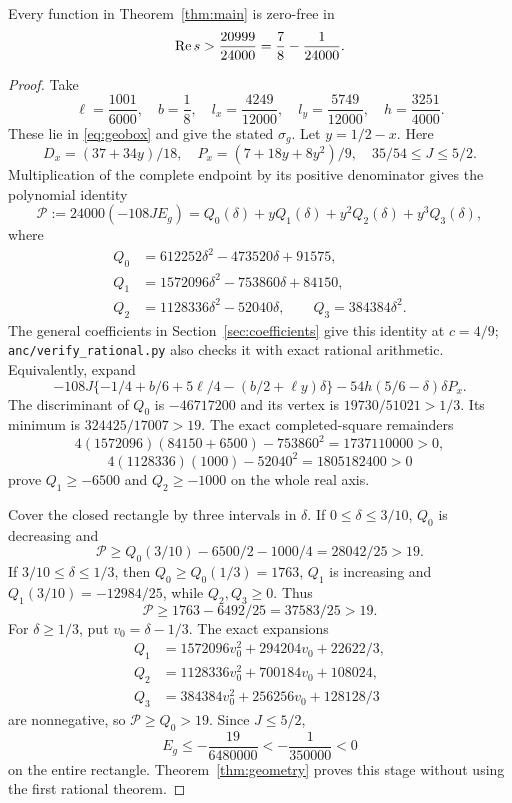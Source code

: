 \begin{theorem}\label{thm:rational2}
Every function in Theorem~\ref{thm:main} is zero-free in
\[
 \operatorname{Re} s>\frac{20999}{24000}=\frac78-\frac1{24000}.
\]
\end{theorem}
\begin{proof}
Take
\[
 \ell=\frac{1001}{6000},\quad b=\frac18,\quad
 l_x=\frac{4249}{12000},\quad l_y=\frac{5749}{12000},\quad
 h=\frac{3251}{4000}.
\]
These lie in \eqref{eq:geobox} and give the stated $\sigma_g$.
Let $y=1/2-x$. Here
\[
 D_x=(37+34y)/18,\quad P_x=(7+18y+8y^2)/9,\quad35/54\le J\le5/2.
\]
Multiplication of the complete endpoint by its positive denominator gives the polynomial identity
\begin{equation}\label{eq:rationalpoly}
 \mathscr P:=24000(-108JE_g)=Q_0(\delta)+yQ_1(\delta)+y^2Q_2(\delta)+y^3Q_3(\delta),
\end{equation}
where
\begin{align*}
 Q_0&=612252\delta^2-473520\delta+91575,\\
 Q_1&=1572096\delta^2-753860\delta+84150,\\
 Q_2&=1128336\delta^2-52040\delta,\qquad Q_3=384384\delta^2.
\end{align*}
The general coefficients in Section~\ref{sec:coefficients} give this identity at $c=4/9$; \nolinkurl{anc/verify_rational.py} also checks it with exact rational arithmetic. Equivalently, expand
\[
 -108J\{-1/4+b/6+5\ell/4-(b/2+\ell y)\delta\}
 -54h(5/6-\delta)\delta P_x.
\]
The discriminant of $Q_0$ is $-46717200$ and its vertex is $19730/51021>1/3$. Its minimum is $324425/17007>19$. The exact completed-square remainders
\[
 4(1572096)(84150+6500)-753860^2=1737110000>0,
\]
\[
 4(1128336)(1000)-52040^2=1805182400>0
\]
prove $Q_1\ge-6500$ and $Q_2\ge-1000$ on the whole real axis.

Cover the closed rectangle by three intervals in $\delta$. If $0\le\delta\le3/10$, $Q_0$ is decreasing and
\[
 \mathscr P\ge Q_0(3/10)-6500/2-1000/4
              =28042/25>19.
\]
If $3/10\le\delta\le1/3$, then $Q_0\ge Q_0(1/3)=1763$, $Q_1$ is increasing and $Q_1(3/10)=-12984/25$, while $Q_2,Q_3\ge0$. Thus
\[
 \mathscr P\ge1763-6492/25=37583/25>19.
\]
For $\delta\ge1/3$, put $v_0=\delta-1/3$. The exact expansions
\begin{align*}
 Q_1&=1572096v_0^2+294204v_0+22622/3,\\
 Q_2&=1128336v_0^2+700184v_0+108024,\\
 Q_3&=384384v_0^2+256256v_0+128128/3
\end{align*}
are nonnegative, so $\mathscr P\ge Q_0>19$. Since $J\le5/2$,
\[
 E_g\le-\frac{19}{6480000}<-\frac1{350000}<0
\]
on the entire rectangle. Theorem~\ref{thm:geometry} proves this stage without using the first rational theorem.
\end{proof}
